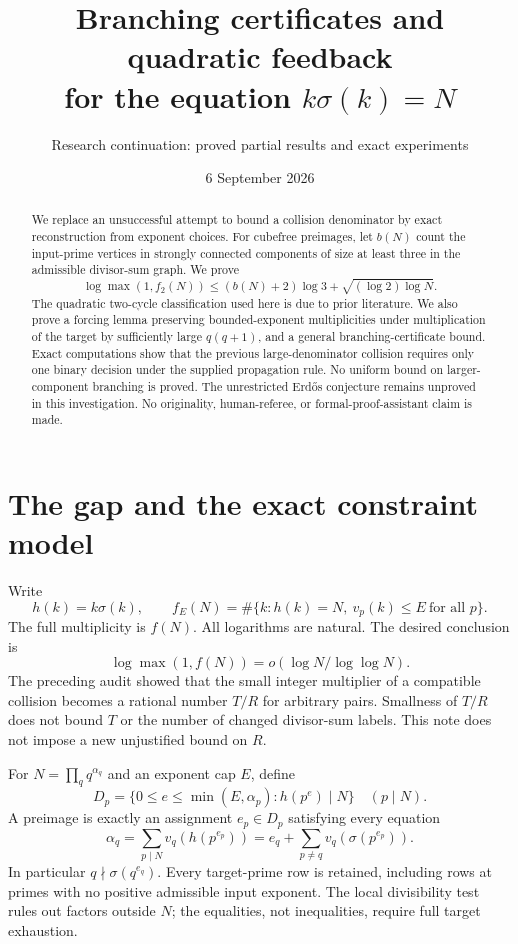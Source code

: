 \documentclass[11pt]{article}
\title{Branching certificates and quadratic feedback\\for the equation \texorpdfstring{$k\sigma(k)=N$}{k sigma(k)=N}}
\author{Research continuation: proved partial results and exact experiments}
\date{6 September 2026}
\begin{document}
\maketitle
\begin{abstract}
We replace an unsuccessful attempt to bound a collision denominator by exact reconstruction from exponent choices. For cubefree preimages, let $b(N)$ count the input-prime vertices in strongly connected components of size at least three in the admissible divisor-sum graph. We prove
\[
 \log\max(1,f_2(N))\le (b(N)+2)\log3+\sqrt{(\log2)\log N}.
\]
The quadratic two-cycle classification used here is due to prior literature. We also prove a forcing lemma preserving bounded-exponent multiplicities under multiplication of the target by sufficiently large $q(q+1)$, and a general branching-certificate bound. Exact computations show that the previous large-denominator collision requires only one binary decision under the supplied propagation rule. No uniform bound on larger-component branching is proved. The unrestricted Erd\H{o}s conjecture remains unproved in this investigation. No originality, human-referee, or formal-proof-assistant claim is made.
\end{abstract}

\section{The gap and the exact constraint model}
Write
\[
 h(k)=k\sigma(k),\qquad f_E(N)=\#\{k:h(k)=N,\ v_p(k)\le E\ \text{for all }p\}.
\]
The full multiplicity is $f(N)$. All logarithms are natural. The desired conclusion is
\[
 \log\max(1,f(N))=o(\log N/\log\log N).
\]
The preceding audit showed that the small integer multiplier of a compatible collision becomes a rational number $T/R$ for arbitrary pairs. Smallness of $T/R$ does not bound $T$ or the number of changed divisor-sum labels. This note does not impose a new unjustified bound on $R$.

For $N=\prod_q q^{\alpha_q}$ and an exponent cap $E$, define
\[
 D_p=\{0\le e\le\min(E,\alpha_p):h(p^e)\mid N\}\quad(p\mid N).
\]
A preimage is exactly an assignment $e_p\in D_p$ satisfying every equation
\begin{equation}\label{eq:rows}
 \alpha_q=\sum_{p\mid N}v_q(h(p^{e_p}))
          =e_q+\sum_{p\ne q}v_q(\sigma(p^{e_p})).
\end{equation}
In particular $q\nmid\sigma(q^{e_q})$. Every target-prime row is retained, including rows at primes with no positive admissible input exponent. The local divisibility test rules out factors outside $N$; the equalities, not inequalities, require full target exhaustion.
\end{document}
